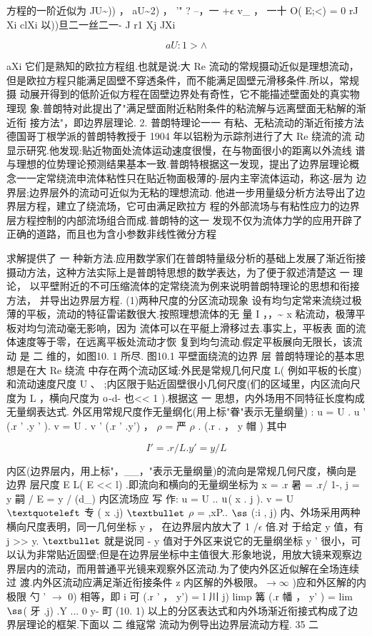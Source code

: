 方程的一阶近似为 JU\textasciitilde{})) ， aU\textasciitilde{}2) ， '" ? --，一 +$\epsilon$ v\_ ， 一十 O( E;<) = 0 rJ Xi clXi 以))旦二一丝二一- J r1 Xj JXi

\[aU:1> \wedge \]

aXi 它们是熟知的欧拉方程组.也就是说:大 Re 流动的常规摄动近似是理想流动， 但是欧拉方程只能满足固壁不穿透条件，而不能满足固壁元滑移条件.所以，常规摄 动展开得到的低阶近似方程在固壁边界处有奇性，它不能描述壁面处的真实物理现 象.普朗特对此提出了"满足壁面附近粘附条件的粘流解与远离壁面无粘解的渐近衔 接方法"，即边界层理论. 2. 普朗特理论一一 有粘、无粘流动的渐近衔接方法 德国哥丁根学派的普朗特教授于 1904 年以铝粉为示踪剂进行了大 Re 绕流的流 动显示研究.他发现:贴近物面处流体运动速度很慢，在与物面很小的距离以外流线 谱与理想的位势理论预测结果基本一致.普朗特根据这一发现，提出了边界层理论概 念一一定常绕流申流体粘性只在贴近物面极薄的-层内主宰流体运动，称这-层为 边界层;边界层外的流动可近似为无粘的理想流动. 他进一步用量级分析方法导出了边界层方程，建立了绕流场，它可由满足欧拉方 程的外部流场与有粘性应力的边界层方程控制的内部流场组合而成.普朗特的这一 发现不仅为流体力学的应用开辟了正确的道路，而且也为含小参数非线性微分方程

求解提供了 一 种新方法.应用数学家们在普朗特量级分析的基础上发展了渐近衔接 摄动方法，这种方法实际上是普朗特思想的数学表达，为了便于叙述清楚这 一 理论， 以平壁附近的不可压缩流体的定常绕流为例来说明普朗特理论的思想和衔接方法， 并导出边界层方程. (1)两种尺度的分区流动现象 设有均匀定常来流绕过极薄的平板，流动的特征雷诺数很大.按照理想流体的无 量 I ，，\textasciitilde{} x 粘流动，极薄平板对均匀流动毫无影响，因为 流体可以在平艇上滑移过去.事实上，平板表 面的流体速度等于零，在远离平板处流动才恢 复到均匀流动.假定平板展向无限长，该流动 是 二 维的，如图10. 1 所尽. 图10.1 平壁面绕流的边界 层 普朗特理论的基本思想是在大 Re 绕流 中存在两个流动区域:外民是常规几何尺度 L( 例如平板的长度)和流动速度尺度 U 、 ;内区限于贴近固壁很小几何尺度(们的区域里，内区流向尺度为 L ，横向尺度为 ${\rm o}$-d- 也<< 1 ).根据这 一 思想，内外场用不同特征长度构成无量纲表达式. 外区用常规尺度作无量纲化(用上标"眷"表示无量纲量) : u = U . u ' (.r ' .y ' ). v = U . v ' (.r ' .y') ， $\rho$ = 严 $\rho$ . (.r . ， y 帽 ) 其中

\[I ' = .r/L. y ' = y / L\]

内区(边界层内，用上标"，\_\_，"表示无量纲量)的流向是常规几何尺度，横向是边界 层尺度 E L( E << l) .即流向和横向的无量纲坐标为 x = .r 暑 = .r/ 1-, j = y 嗣 / E = y / (d\_) 内区流场应 写 作: u = U .. ${\rm u}$( x . j ). v = U ${\rm ‘}$ 专 ( x .j) ${\rm •}$ $\rho$ = ,xP.. ${\rm ß}$ (:i , j) 内、外场采用两种横向尺度表明，同一几何坐标 y ， 在边界层内放大了 1 /$\epsilon$ 倍.对 于给定 y 值，有 j >> y. ${\rm •}$ 就是说同 - y 值对于外区来说它的无量纲坐标 y ' 很小，可 以认为非常贴近固壁;但是在边界层坐标中主值很大.形象地说，用放大镜来观察边 界层内的流动，而用普通平光镜来观察外区流动.为了使内外区近似解在全场连续过 渡.内外区流动应满足渐近衔接条件 z 内区解的外极限。$\rightarrow$$\infty$ )应和外区解的内极限 勺 ' $\rightarrow$ 0) 相等，即 i 可 (.r ' ， y') = l 川 j) limp 篝 (.r 幡 ， y' ) = lim${\rm ß}$( 牙 .j) .Y ... 0 y- 町 (10. 1) 以上的分区表达式和内外场渐近衔接式构成了边界层理论的框架.下面以 二 维寇常 流动为例导出边界层流动方程. 35 二

